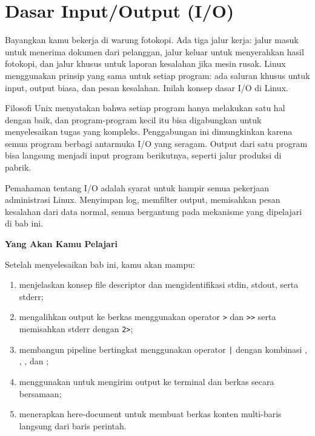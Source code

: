 
\chapter{Dasar Input/Output (I/O)}
\label{ch:basic-io}


Bayangkan kamu bekerja di warung fotokopi. Ada tiga jalur kerja: jalur masuk untuk menerima dokumen dari pelanggan, jalur keluar untuk menyerahkan hasil fotokopi, dan jalur khusus untuk laporan kesalahan jika mesin rusak. Linux menggunakan prinsip yang sama untuk setiap program: ada saluran khusus untuk input, output biasa, dan pesan kesalahan. Inilah konsep dasar I/O di Linux.

Filosofi Unix menyatakan bahwa setiap program hanya melakukan satu hal dengan baik, dan program-program kecil itu bisa digabungkan untuk menyelesaikan tugas yang kompleks. Penggabungan ini dimungkinkan karena semua program berbagi antarmuka I/O yang seragam. Output dari satu program bisa langsung menjadi input program berikutnya, seperti jalur produksi di pabrik.

Pemahaman tentang I/O adalah syarat untuk hampir semua pekerjaan administrasi Linux. Menyimpan log, memfilter output, memisahkan pesan kesalahan dari data normal, semua bergantung pada mekanisme yang dipelajari di bab ini.

\textbf{Yang Akan Kamu Pelajari}

Setelah menyelesaikan bab ini, kamu akan mampu:

\begin{enumerate}
    \item menjelaskan konsep file descriptor dan mengidentifikasi stdin, stdout, serta stderr;
    \item mengalihkan output ke berkas menggunakan operator \texttt{>} dan \texttt{>>} serta memisahkan stderr dengan \texttt{2>};
    \item membangun pipeline bertingkat menggunakan operator \texttt{|} dengan kombinasi , , , dan ;
    \item menggunakan  untuk mengirim output ke terminal dan berkas secara bersamaan;
    \item menerapkan here-document untuk membuat berkas konten multi-baris langsung dari baris perintah.
\end{enumerate}

